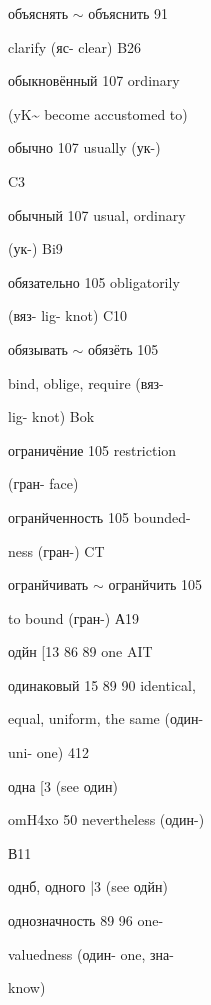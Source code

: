 \clearpage
\thispagestyle{plain}
\begingroup
\cyrillicfont
\fontsize{7.25}{8.25}\selectfont
\setlength{\parindent}{0pt}
\setlength{\parskip}{0pt}
\setlength{\emergencystretch}{1.5em}
\noindent
\begin{minipage}[t]{0.475\textwidth}
\raggedright
\noindent объяснять $\sim$ объяснить 91\par
\noindent clarify (яс- clear) B26\par
\noindent обыкновённый 107 ordinary\par
\noindent (yK\textasciitilde{} become accustomed to)\par
\noindent обычно 107 usually (ук-)\par
\noindent C3\par
\noindent обычный 107 usual, ordinary\par
\noindent (ук-) Bi9\par
\noindent обязательно 105 obligatorily\par
\noindent (вяз- lig- knot) C10\par
\noindent обязывать $\sim$ обязёть 105\par
\noindent bind, oblige, require (вяз-\par
\noindent lig- knot) Bok\par
\noindent ограничёние 105 restriction\par
\noindent (гран- face)\par
\noindent огранйченность 105 bounded-\par
\noindent ness (гран-) CT\par
\noindent огранйчивать $\sim$ огранйчить 105\par
\noindent to bound (гран-) А19\par
\noindent одйн [13 86 89 one AIT\par
\noindent одинаковый 15 89 90 identical,\par
\noindent equal, uniform, the same (один-\par
\noindent uni- one) 412\par
\noindent одна [3 (see один)\par
\noindent omH4xo 50 nevertheless (один-)\par
\noindent В11\par
\noindent однб, одного |3 (see одйн)\par
\noindent однозначность 89 96 one-\par
\noindent valuedness (один- one, зна-\par
\noindent know)\par

\end{minipage}
